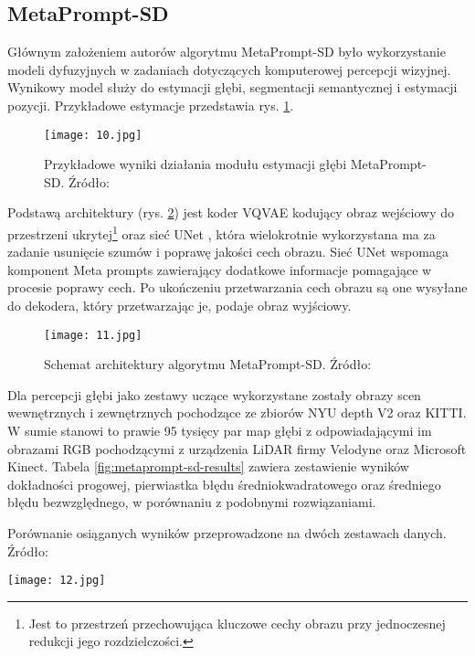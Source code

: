 \subsection{MetaPrompt-SD}
Głównym założeniem autorów algorytmu MetaPrompt-SD \cite{wan2023} było wykorzystanie modeli dyfuzyjnych w zadaniach dotyczących komputerowej percepcji wizyjnej. Wynikowy model służy do estymacji głębi, segmentacji semantycznej i estymacji pozycji. Przykładowe estymacje przedstawia rys. \ref{fig:metaprompt-sd}.
\begin{figure}[H]
    \centering
    \texttt{[image: 10.jpg]}
    \caption{Przykładowe wyniki działania modułu estymacji głębi MetaPrompt-SD. Źródło: \cite{wan2023}}
    \label{fig:metaprompt-sd}
\end{figure}
Podstawą architektury (rys. \ref{fig:metaprompt-sd-schema}) jest koder VQVAE \cite{oord2018} kodujący obraz wejściowy do przestrzeni ukrytej\footnote{Jest to przestrzeń przechowująca kluczowe cechy obrazu przy jednoczesnej redukcji jego rozdzielczości.} oraz sieć UNet \cite{ronneberger2015}, która wielokrotnie wykorzystana ma za zadanie usunięcie szumów i poprawę jakości cech obrazu. Sieć UNet wspomaga komponent Meta prompts zawierający dodatkowe informacje pomagające w procesie poprawy cech. Po ukończeniu przetwarzania cech obrazu są one wysyłane do dekodera, który przetwarzając je, podaje obraz wyjściowy.
\begin{figure}[H]
    \centering
    \texttt{[image: 11.jpg]}
    \caption{Schemat architektury algorytmu MetaPrompt-SD. Źródło: \cite{wan2023}}
    \label{fig:metaprompt-sd-schema}
\end{figure}
Dla percepcji głębi jako zestawy uczące wykorzystane zostały obrazy scen wewnętrznych i zewnętrznych pochodzące ze zbiorów NYU depth V2 oraz KITTI. W sumie stanowi to prawie 95 tysięcy par map głębi z odpowiadającymi im obrazami RGB pochodzącymi z urządzenia LiDAR firmy Velodyne oraz Microsoft Kinect. Tabela \ref{fig:metaprompt-sd-results} zawiera zestawienie wyników dokładności progowej, pierwiastka błędu średniokwadratowego oraz średniego błędu bezwzględnego, w porównaniu z podobnymi rozwiązaniami.
\begin{table}[H]
    \centering
    \caption{Porównanie osiąganych wyników przeprowadzone na dwóch zestawach danych. Źródło: \cite{wan2023}}
    \texttt{[image: 12.jpg]}
    \label{fig:metaprompt-sd-results}
\end{table}

